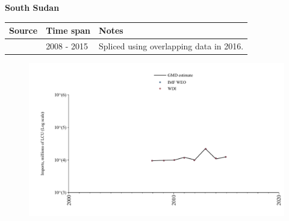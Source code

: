 \documentclass[12pt,a4paper,landscape]{article}
\begin{document}
\begin{adjustbox}{max totalsize={\paperwidth}{\paperheight},center}
\begin{minipage}[t][\textheight][t]{\textwidth}
\vspace*{0.5cm}
{}
\begin{center}
{\Large\bfseries South Sudan}
\end{center}
\vspace{0.5cm}
\begin{table}[H]
\centering
\small
\begin{tabular}{|l|l|l|}
\hline
\textbf{Source} & \textbf{Time span} & \textbf{Notes} \\
\hline
\rowcolor{white}\cite{WDI}& 2008 - 2015 &Spliced using overlapping data in 2016.\\
\hline
\end{tabular}
\end{table}
\begin{figure}[H]
\centering
\includegraphics[width=\textwidth,height=0.6\textheight,keepaspectratio]{graphs/SSD_imports.pdf}
\end{figure}
\end{minipage}
\end{adjustbox}
\end{document}
